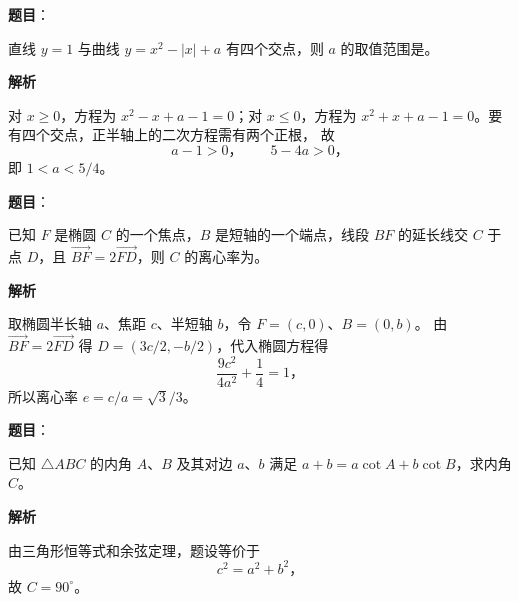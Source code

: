 \begin{answer}

\textbf{题目}：

直线 $y=1$ 与曲线 $y=x^2-|x|+a$ 有四个交点，则 $a$ 的取值范围是\gkblank{}。

\textbf{解析}

对 $x\geq0$，方程为 $x^2-x+a-1=0$；对 $x\leq0$，方程为
$x^2+x+a-1=0$。要有四个交点，正半轴上的二次方程需有两个正根，
故
\nopagebreak[4]
\[
a-1>0\text{，}\qquad 5-4a>0\text{，}
\]
即 $1<a<5/4$。


\end{answer}
\begin{answer}

\textbf{题目}：

已知 $F$ 是椭圆 $C$ 的一个焦点，$B$ 是短轴的一个端点，线段 $BF$ 的延长线交 $C$ 于点 $D$，且 $\overrightarrow{BF}=2\overrightarrow{FD}$，则 $C$ 的离心率为\gkblank{}。

\textbf{解析}

取椭圆半长轴 $a$、焦距 $c$、半短轴 $b$，令 $F=(c,0)$、$B=(0,b)$。
由 $\overrightarrow{BF}=2\overrightarrow{FD}$ 得 $D=(3c/2,-b/2)$，代入椭圆方程得
\nopagebreak[4]
\[
\frac{9c^2}{4a^2}+\frac14=1\text{，}
\]
所以离心率 $e=c/a=\sqrt3/3$。


\end{answer}
\begin{answer}

\textbf{题目}：

已知 $\triangle ABC$ 的内角 $A\text{、}B$ 及其对边 $a\text{、}b$ 满足 $a+b=a\cot A+b\cot B$，求内角 $C$。

\textbf{解析}

由三角形恒等式和余弦定理，题设等价于
\nopagebreak[4]
\[
c^2=a^2+b^2\text{，}
\]
故 $C=90^\circ$。


\end{answer}
